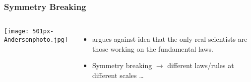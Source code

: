 \begin{frame}
  \frametitle{Symmetry Breaking}

  \begin{block}{}
    
    \bigskip
    
    \begin{columns}
      \texttt{[image: 501px-Andersonphoto.jpg]}
      \begin{itemize}
      \item<2-> 
        argues against idea that the only real scientists are
        those working on the fundamental laws.
      \item<3->
        Symmetry breaking $\rightarrow$ different laws/rules at
        different scales \ldots
      \end{itemize}
    \end{columns}

    \bigskip

  \end{block}

\end{frame}


